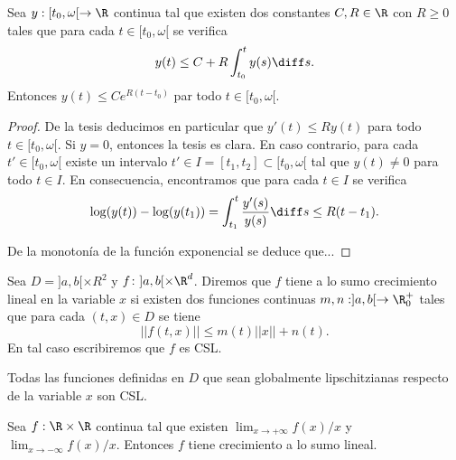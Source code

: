 \documentclass{article}
\begin{document}
\begin{lemma}
  Sea $y:[t_0, \omega[ \to \R$ continua tal que existen dos constantes $C, R \in \R$ con $R \ge 0$
  tales que para cada $t \in [t_0, \omega[$ se verifica
  \[ y(t) \le C + R \int_{t_0}^{t} y(s) \diff s. \] Entonces $y(t) \le C e^{R(t-t_0)}$ par
  todo $t \in [t_0, \omega[$.
\end{lemma}
\begin{proof}
  De la tesis deducimos en particular que $y'(t) \le R y(t)$ para todo $t \in [t_0, \omega[$. Si
  $y = 0$, entonces la tesis es clara. En caso contrario, para cada $t' \in [t_0, \omega[$ existe un
  intervalo $t' \in I = [t_1, t_2] \subset [t_0, \omega[$ tal que $y(t) \ne 0$ para todo $t \in
  I$. En consecuencia, encontramos que para cada $t \in I$ se verifica
  \[ \log(y(t)) - \log(y(t_1)) = \int_{t_1}^{t} \frac{y'(s)}{y(s)} \diff s \le R(t-t_1).\]

  De la monotonía de la función exponencial se deduce que...

\end{proof}

\begin{definition}
  Sea $D = ]a,b[ \times R^2$ y $f\colon ]a,b[\times\R^d$. Diremos que $f$ tiene a lo sumo crecimiento
  lineal en la variable $x$ si existen dos funciones continuas $m, n : ]a,b[ \to \R^+_0$ tales que
  para cada $(t,x) \in D$ se tiene
  \[ ||f(t,x)|| \le m(t) ||x|| + n(t).\] En tal caso escribiremos que $f$ es CSL.
\end{definition}

\begin{remark}
  Todas las funciones definidas en $D$ que sean globalmente lipschitzianas respecto de la variable
  $x$ son CSL.
\end{remark}

\begin{remark}
  Sea $f : \R \times \R$ continua tal que existen $\lim_{x \to +\infty} f(x)/x$ y
  $\lim_{x \to -\infty} f(x)/x$. Entonces $f$ tiene crecimiento a lo sumo lineal.
\end{remark}
\end{document}
